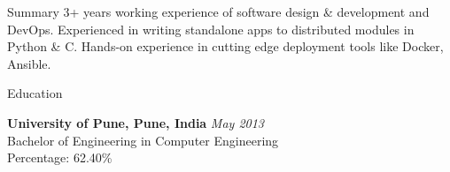 \documentclass{resume} %
\begin{document}
\begin{rSection}{Summary}
3+ years working experience of software design \& development and DevOps. Experienced in writing standalone apps to distributed modules in Python \& C. Hands-on experience in cutting edge deployment tools like Docker, Ansible. 
\end{rSection}

\begin{rSection}{Education}

{\bf University of Pune, Pune, India} \hfill {\em May 2013} \\ 
Bachelor of Engineering in Computer Engineering \\
Percentage: 62.40\%

\end{rSection}

\end{document}
